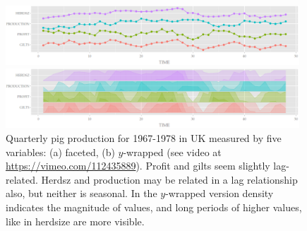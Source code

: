 \documentclass[12pt]{article}
\begin{document}
\begin{center}
\begin{figure}[htp]
\begin{centering}
\includegraphics[width=0.98\textwidth]{graph/pipeline-17-original-wp-l}
\end{centering}

\begin{centering}
\includegraphics[width=0.98\textwidth]{graph/pipeline-17-ywrap-w}
\end{centering}

\caption{\label{fig:y-wrapping}Quarterly pig production for
1967-1978 in UK measured by five variables: (a) faceted, (b)
$y$-wrapped (see video at \url{https://vimeo.com/112435889}).
Profit and gilts seem slightly lag-related. Herdsz and
production may be related in a lag relationship also, but
neither is seasonal. In the $y$-wrapped version density indicates
the magnitude of values, and long periods of higher values,
like in herdsize are more visible. }
\end{figure}

\end{center}
\end{document}
